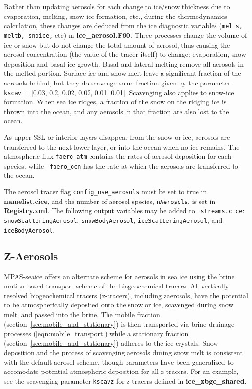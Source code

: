 Rather than updating aerosols for each change to ice/snow thickness
due to evaporation, melting,  snow-ice formation, etc., during the
thermodynamics calculation, these  changes are deduced from the
ice diagnostic variables  ({\tt melts, meltb, snoice,} etc) in {\bf
  ice\_aerosol.F90}.   Three processes change the volume of ice or
snow but do not change the  total amount of aerosol, thus causing the
aerosol concentration  (the value of the tracer itself) to change:
evaporation, snow deposition  and basal ice growth.  Basal and lateral
melting remove all  aerosols in the melted portion.  Surface ice and
snow melt leave a  significant fraction of the aerosols behind, but
they do scavenge some fraction given by the parameter  {\tt
  kscav} = [0.03, 0.2, 0.02, 0.02, 0.01, 0.01].   Scavenging also applies
to snow-ice formation.   When sea ice ridges, a fraction of the snow
on the ridging ice is  thrown into the ocean, and any aerosols in that
fraction are also  lost to the ocean.

As upper SSL or interior layers disappear from the snow or ice,
aerosols are transferred to the  next lower layer, or into the ocean
when no ice remains.   The atmospheric flux {\tt faero\_atm} contains
the rates of aerosol  deposition for each species, while {\tt
  faero\_ocn} has the rate at  which the aerosols are transferred to the ocean.

The aerosol tracer flag {\tt config\_use\_aerosols} must be set to true in {\bf
  namelist.cice}, and the number  of aerosol species, {\tt nAerosols}, is set in {\bf
  Registry.xml}.  The following output variables may be added to {\tt
  streams.cice}: {\tt snowScatteringAerosol}, {\tt snowBodyAerosol},
{\tt iceScatteringAerosol}, and {\tt iceBodyAerosol}. 

\subsection{Z-Aerosols}

MPAS-seaice  offers an alternate scheme for aerosols
in sea ice using the brine motion based transport scheme of the
biogeochemical tracers.   All vertically resolved biogeochemical
tracers (z-tracers), including
zaerosols, have the potential to be atmospherically deposited onto the
snow or ice, scavenged during snow melt, and passed into the brine.
The mobile fraction (section~\ref{sec:mobile_and_stationary}) is then transported via brine drainage processes
(\ref{eqn:mobile_transport})
while a stationary fraction (section~\ref{sec:mobile_and_stationary}) adheres
to the ice crystals.  Snow deposition and the process of
scavenging aerosols during snow melt is consistent with the default
aerosol scheme, though parameters have been generalized to accomodate
potential atmospheric deposition for all z-tracers.  For an example,
see the scavenging parameter {\tt kscavz} for z-tracers defined in {\bf
  ice\_zbgc\_shared}.

